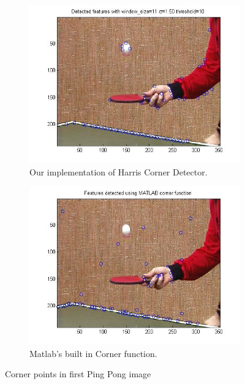 \documentclass[11pt]{article}
\begin{document}
\begin{figure}[H] \centering
	\begin{subfigure}{.5\textwidth} \centering
		\includegraphics[width=1\textwidth]{imgs/ourCorners_pingpong.jpg}
		\caption{Our implementation of Harris Corner Detector.}
		\label{fig:ourCorners_pingpong}
	\end{subfigure}%
	\begin{subfigure}{.5\textwidth} \centering
		\includegraphics[width=1\textwidth]{imgs/matlabCorners_pingpong.jpg}
		\caption{Matlab's built in Corner function.}
		\label{fig:matlabCorners_pingpong}
	\end{subfigure}
	\caption{Corner points in first Ping Pong image}
	\label{fig:corners_pingpong}
\end{figure}
\end{document}
